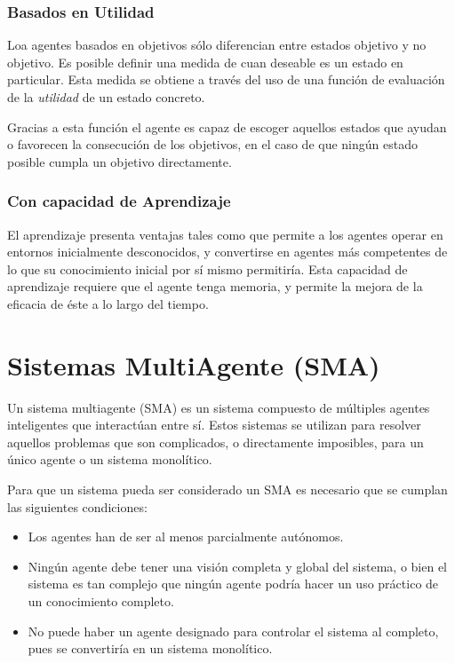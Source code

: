 \subsubsection{Basados en Utilidad}

Loa agentes basados en objetivos sólo diferencian entre estados objetivo y no
objetivo. Es posible definir una medida de cuan deseable es un estado en
particular. Esta medida se obtiene a través del uso de una función de
evaluación de la {\em utilidad} de un estado concreto.

Gracias a esta función el agente es capaz de escoger aquellos estados que
ayudan o favorecen la consecución de los objetivos, en el caso de que ningún
estado posible cumpla un objetivo directamente.

\subsubsection{Con capacidad de Aprendizaje}

El aprendizaje presenta ventajas tales como que permite a los agentes operar en
entornos inicialmente desconocidos, y convertirse en agentes más competentes
de lo que su conocimiento inicial por sí mismo permitiría. Esta capacidad de
aprendizaje requiere que el agente tenga memoria, y permite la mejora de la
eficacia de éste a lo largo del tiempo.

\section{Sistemas MultiAgente (SMA)}


Un sistema multiagente (SMA) es un sistema compuesto de múltiples agentes
inteligentes que interactúan entre sí. Estos sistemas se utilizan para resolver
aquellos problemas que son complicados, o directamente imposibles, para un único
agente o un sistema monolítico.

Para que un sistema pueda ser considerado un SMA es necesario que se cumplan
las siguientes condiciones:

\begin{itemize}
 \item Los agentes han de ser al menos parcialmente autónomos.
 \item Ningún agente debe tener una visión completa y global del sistema, o
 bien el sistema es tan complejo que ningún agente podría hacer un uso práctico
 de un conocimiento completo.
 \item No puede haber un agente designado para controlar el sistema al
 completo, pues se convertiría en un sistema monolítico.
\end{itemize}

